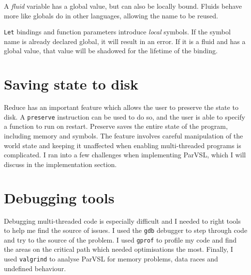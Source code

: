 A \emph{fluid} variable has a global value, but can also be locally bound. Fluids behave more like globals do
in other languages, allowing the name to be reused.

\texttt{Let} bindings and function parameters introduce \emph{local} symbols. If the symbol name is already declared global,
it will result in an error. If it is a fluid and has a global value, that value will be shadowed for the lifetime
of the binding.

\section{Saving state to disk}
Reduce has an important feature which allows the user to preserve the state to disk. A \texttt{preserve} instruction can be
used to do so, and the user is able to specify a function to run on restart. Preserve saves the entire state of the
program, including memory and symbols. The feature involves careful manipulation of the world state and keeping it
unaffected when enabling multi-threaded programs is complicated. I ran into a few challenges when implementing ParVSL,
which I will discuss in the implementation section.

\section{Debugging tools}

Debugging multi-threaded code is especially difficult and I
needed to right tools to help me find the source of issues. I used
the \verb|gdb| \cite{gdb} debugger to step through code and try to the source
of the problem. I used \verb|gprof| \cite{gprof} to profile my code and find
the areas on the critical path which needed optimisations the most. Finally,
I used \verb|valgrind| \cite{valgrind} to analyse ParVSL for memory
problems, data races and undefined behaviour.
